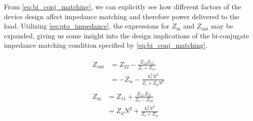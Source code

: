 \documentclass[lettersize,journal]{IEEEtran}
\begin{document}
\noindent{}From \eqref{eq:bi_conj_matching}, we can explicitly see how different factors of the device design affect impedance matching and therefore power delivered to the load.
Utilizing \eqref{eq:pto_impedance}, the expressions for $Z_{\textrm{in}}$ and $Z_{\textrm{out}}$ may be expanded, giving us some insight into the design implications of the bi-conjugate impedance matching condition specified by \eqref{eq:bi_conj_matching}.

\begin{subequations}
\begin{align}
        \begin{split}
                Z_{\textrm{out}} &= Z_{22} - \frac{Z_{12} Z_{12}}{Z_{i} + Z_{11}} \\[0.5em]
                &= - Z_w - \frac{k_\tau^2 N^2}{Z_i + Z_d N^2}
        \end{split}\label{eq:expanded_zin} \\[1em]
        \begin{split}
                Z_{\textrm{in}} &= Z_{11} + \frac{Z_{12} \, Z_{21}}{Z_\ell - Z_{22}} \\[0.5em]
                &= Z_d N^2 + \frac{k_\tau^2 N^2}{Z_\ell + Z_w}
        \end{split}\label{eq:expanded_zout}
\end{align}
\end{subequations}

\end{document}
